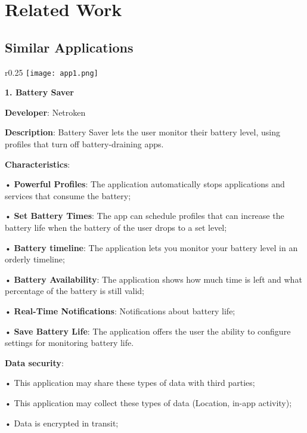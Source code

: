 
\chapter{Related Work}\label{chapter:chap3}

\section{Similar Applications}\label{sect:similar applications}

\begin{wrapfigure}{r}{0.25\textwidth} 
    \centering
    \texttt{[image: app1.png]}
\end{wrapfigure}

\textbf{1. Battery Saver}

\textbf{Developer}: Netroken

\textbf{Description}: Battery Saver lets the user monitor their battery level, using profiles that turn off battery-draining apps.

\textbf{Characteristics}:

• \textbf{Powerful Profiles}: The application automatically stops applications and services that consume the battery;

• \textbf{Set Battery Times}: The app can schedule profiles that can increase the battery life when the battery of the user drops to a set level;

• \textbf{Battery timeline}: The application lets you monitor your battery level in an orderly timeline;

• \textbf{Battery Availability}: The application shows how much time is left and what percentage of the battery is still valid;

• \textbf{Real-Time Notifications}: Notifications about battery life;

• \textbf{Save Battery Life}: The application offers the user the ability to configure settings for monitoring battery life.

\textbf{Data security}:

• This application may share these types of data with third parties;

• This application may collect these types of data (Location, in-app activity);

• Data is encrypted in transit;


